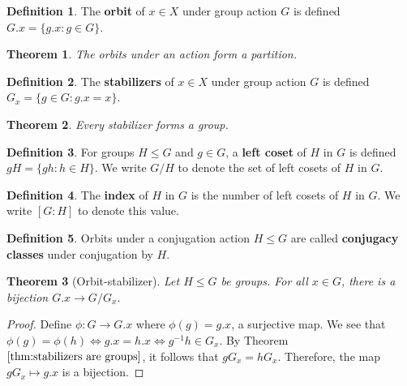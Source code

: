 \documentclass[
    parskip=half,
    toc=flat,
    toc=sectionentrydotfill,
]{scrartcl}  %
\theoremstyle{definition}
\newtheorem{definition}{Definition}[section]
\theoremstyle{plain}
\newtheorem{theorem}{Theorem}[section]
\theoremstyle{remark}
\begin{document}
\begin{definition}
    The \textbf{orbit} of $x\in X$ under group action $G$ is defined
    $G.x=\{g.x:g\in G\}$.
\end{definition}

\begin{theorem}
    The orbits under an action form a partition.
\end{theorem}


\begin{definition}
    The \textbf{stabilizers} of $x\in X$ under group action $G$ is defined
    $G_x=\{g\in G:g.x=x\}$.
\end{definition}

\begin{theorem}
    \label{thm:stabilizers are groups}
    Every stabilizer forms a group.
\end{theorem}

\begin{definition}
    For groups $H\leq G$ and $g\in G$, a \textbf{left coset} of $H$ in $G$ is
    defined $gH=\{gh:h\in H\}$.
    We write $G/H$ to denote the set of left cosets of $H$ in $G$.
\end{definition}

\begin{definition}
    The \textbf{index} of $H$ in $G$ is the number of left cosets of $H$ in
    $G$.
    We write $[G:H]$ to denote this value.
\end{definition}

\begin{definition}
    Orbits under a conjugation action $H\leq G$ are called
    \textbf{conjugacy classes} under conjugation by $H$.
\end{definition}

\begin{theorem}[Orbit-stabilizer]
    Let $H\leq G$ be groups.
    For all $x\in G$, there is a bijection $G.x\to G/G_x$.
\end{theorem}

\begin{proof}
    Define $\phi:G\to G.x$ where $\phi(g)=g.x$, a surjective map.
    We see that $\phi(g)=\phi(h)\iff g.x=h.x\iff g^{-1}h\in G_x$.
    By Theorem $\ref{thm:stabilizers are groups}$, it follows that $gG_x=hG_x$.
    Therefore, the map $gG_x\mapsto g.x$ is a bijection.
\end{proof}
\end{document}
